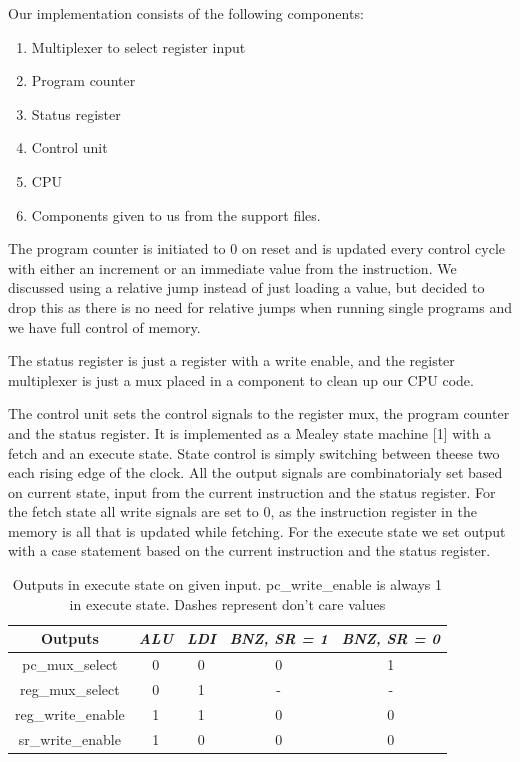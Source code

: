\documentclass[10pt]{report}
\begin{document}
Our implementation consists of the following components:
	
\begin{enumerate}
\item Multiplexer to select register input
\item Program counter
\item Status register
\item Control unit
\item CPU
\item Components given to us from the support files.
\end{enumerate}
	
The program counter is initiated to 0 on reset and is updated every control cycle
with either an increment or an immediate value from the instruction. 
We discussed using a relative jump instead of just loading a value, 
but decided to drop this as there is no need for relative jumps when running single programs
and we have full control of memory.
  
The status register is just a register with a write enable, and the register multiplexer is 
just a mux placed in a component to clean up our CPU code.  

The control unit sets the control signals to the register mux, the program counter 
and the status register. It is implemented as a Mealey state machine [1]
with a fetch and an execute state. State control is simply switching between theese two
each rising edge of the clock. All the output signals are combinatorialy set based on current
state, input from the current instruction and the status register. For the fetch state all
write signals are set to 0, as the instruction register in the memory is all that is updated
while fetching. For the execute state we set output with a case statement based on the current 
instruction and the status register. 

\begin{table}[h]
  \centering
  \begin{tabular}{|c|c|c|c|c|} \hline
    Outputs&\emph{ALU}&\emph{LDI}&\emph{BNZ, SR = 1}&\emph{BNZ, SR = 0}\\ \hline
    pc\_mux\_select&0&0&0&1  \\
    reg\_mux\_select&0&1&-&-  \\
    reg\_write\_enable&1&1&0&0  \\
    sr\_write\_enable&1&0&0&0  \\
    \hline
  \end{tabular}
  \caption{Outputs in execute state on given input.
  pc\_write\_enable is always 1 in execute state. Dashes represent don't care values}
\end{table}
\end{document}
